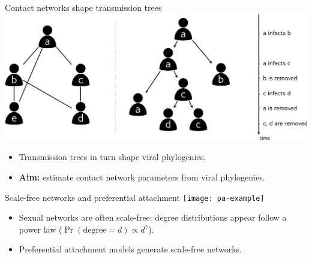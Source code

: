 \documentclass{beamer}
\begin{document}
\begin{frame}{Contact networks shape transmission trees}
  \includegraphics[width=\textwidth]{contactnet}

  \begin{itemize}
      \pause
    \item Transmission trees in turn shape viral phylogenies.
      \pause
    \item \textbf{Aim:} estimate contact network parameters from viral
      phylogenies.
  \end{itemize}
\end{frame}

\begin{frame}{Scale-free networks and preferential attachment}
  \texttt{[image: pa-example]}
  \begin{itemize}
    \item Sexual networks are often scale-free: degree distributions appear
      follow a power law ($\Pr(\text{degree} = d) \propto d^{\gamma}$).
      \pause
    \item Preferential attachment models generate scale-free networks.
  \end{itemize}
\end{frame}
\end{document}
